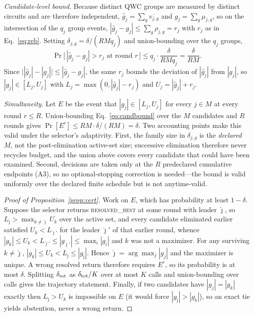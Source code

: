 \documentclass[aps,pra,reprint,superscriptaddress,nofootinbib,floatfix]{revtex4-2}
\begin{document}
\emph{Candidate-level bound.} Because distinct QWC groups are measured by distinct circuits and are therefore independent, $\widehat g_j=\sum_g\overline{v_{j,g}}$ and $g_j=\sum_g\mu_{j,g}$, so on the intersection of the $q_j$ group events, $|\widehat g_j-g_j|\le\sum_g\rho_{j,g}=r_j$ with $r_j$ as in Eq.~\eqref{eq:reb}. Setting $\delta_{j,g}=\delta/(RMq_j)$ and union-bounding over the $q_j$ groups,
\begin{equation}
\Pr\bigl[\,|\widehat g_j-g_j|>r_j \text{ at round } r\,\bigr]\le q_j\cdot\frac{\delta}{RMq_j}=\frac{\delta}{RM}.
\label{eq:candbound}
\end{equation}
Since $\bigl||\widehat g_j|-|g_j|\bigr|\le|\widehat g_j-g_j|$, the same $r_j$ bounds the deviation of $|\widehat g_j|$ from $|g_j|$, so $|g_j|\in[L_j,U_j]$ with $L_j=\max(0,|\widehat g_j|-r_j)$ and $U_j=|\widehat g_j|+r_j$.

\emph{Simultaneity.} Let $E$ be the event that $|g_j|\in[L_j,U_j]$ for every $j\in M$ at every round $r\le R$. Union-bounding Eq.~\eqref{eq:candbound} over the $M$ candidates and $R$ rounds gives $\Pr[E^c]\le RM\cdot\delta/(RM)=\delta$. Two accounting points make this valid under the selector's adaptivity. First, the family size in $\delta_{j,g}$ is the \emph{declared} $M$, not the post-elimination active-set size; successive elimination therefore never recycles budget, and the union above covers every candidate that could have been examined. Second, decisions are taken only at the $R$ predeclared cumulative endpoints (A3), so no optional-stopping correction is needed---the bound is valid uniformly over the declared finite schedule but is not anytime-valid.

\begin{proof}[Proof of Proposition~\ref{prop:cert}]
Work on $E$, which has probability at least $1-\delta$. Suppose the selector returns \textsc{resolved\_best} at some round with leader $\hat\jmath$, so $L_{\hat\jmath}>\max_{k\neq\hat\jmath}U_k$ over the active set, and every candidate eliminated earlier satisfied $U_k<L_{\hat\jmath'}$ for the leader $\hat\jmath'$ of that earlier round, whence $|g_k|\le U_k<L_{\hat\jmath'}\le|g_{\hat\jmath'}|\le\max_i|g_i|$ and $k$ was not a maximizer. For any surviving $k\neq\hat\jmath$, $|g_k|\le U_k<L_{\hat\jmath}\le|g_{\hat\jmath}|$. Hence $\hat\jmath=\arg\max_j|g_j|$ and the maximizer is unique. A wrong resolved return therefore requires $E^c$, so its probability is at most $\delta$. Splitting $\delta_{\rm tot}$ as $\delta_{\rm tot}/K$ over at most $K$ calls and union-bounding over calls gives the trajectory statement. Finally, if two candidates have $|g_j|=|g_k|$ exactly then $L_{\hat\jmath}>U_k$ is impossible on $E$ (it would force $|g_{\hat\jmath}|>|g_k|$), so an exact tie yields abstention, never a wrong return.
\end{proof}
\end{document}
